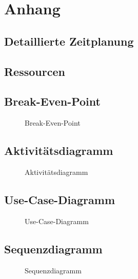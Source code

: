 \section{Anhang}
\subsection{Detaillierte Zeitplanung}
\label{app:Zeitplanung}
\clearpage

\subsection{Ressourcen}
\label{app:Ressourcen}

\clearpage

\subsection{Break-Even-Point}
\label{app:BreakEvenPoint}
\begin{figure}[!htb]
    \centering
    \caption{Break-Even-Point}
\end{figure}


\clearpage

\subsection{Aktivitätsdiagramm}
\label{app:Aktivitaet}
\begin{figure}[!htb]
    \centering
    \caption{Aktivitätsdiagramm}
\end{figure}
\clearpage

\subsection{Use-Case-Diagramm}
\label{app:UseCase}
\begin{figure}[!htb]
    \centering
    \caption{Use-Case-Diagramm}
\end{figure}

\subsection{Sequenzdiagramm}
\label{app:Sequenz}
\begin{figure}[!htb]
    \centering
    \caption{Sequenzdiagramm}
\end{figure}

